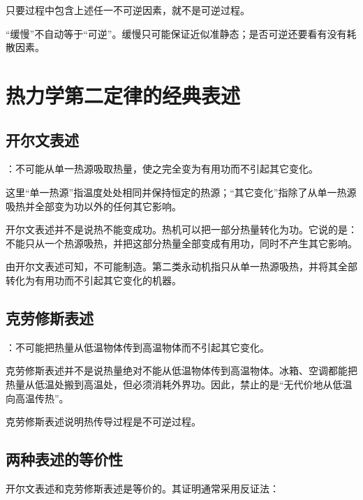 只要过程中包含上述任一不可逆因素，就不是可逆过程。

\begin{WarnBox}[热学B判断题常见陷阱]
“缓慢”不自动等于“可逆”。缓慢只可能保证近似准静态；是否可逆还要看有没有耗散因素。
\end{WarnBox}

\section{热力学第二定律的经典表述}

\subsection{开尔文表述}

：不可能从单一热源吸取热量，使之完全变为有用功而不引起其它变化。

这里“单一热源”指温度处处相同并保持恒定的热源；“其它变化”指除了从单一热源吸热并全部变为功以外的任何其它影响。

\begin{KeyBox}[开尔文表述的含义]
开尔文表述并不是说热不能变成功。热机可以把一部分热量转化为功。它说的是：不能只从一个热源吸热，并把这部分热量全部变成有用功，同时不产生其它影响。
\end{KeyBox}

由开尔文表述可知，不可能制造。第二类永动机指只从单一热源吸热，并将其全部转化为有用功而不引起其它变化的机器。

\subsection{克劳修斯表述}

：不可能把热量从低温物体传到高温物体而不引起其它变化。

\begin{KeyBox}[克劳修斯表述的含义]
克劳修斯表述并不是说热量绝对不能从低温物体传到高温物体。冰箱、空调都能把热量从低温处搬到高温处，但必须消耗外界功。因此，禁止的是“无代价地从低温向高温传热”。
\end{KeyBox}

克劳修斯表述说明热传导过程是不可逆过程。

\subsection{两种表述的等价性}

开尔文表述和克劳修斯表述是等价的。其证明通常采用反证法：

